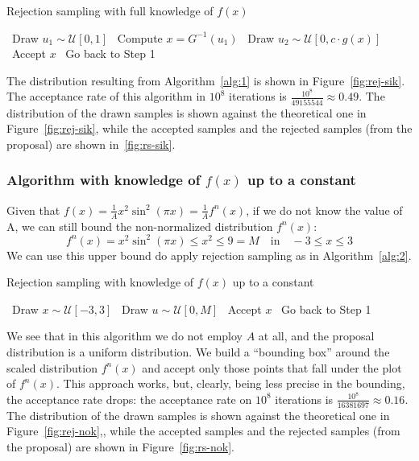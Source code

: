 \documentclass[a4paper,12pt]{article}
\begin{document}
\begin{algorithm}
  \caption{Rejection sampling with full knowledge of $f(x)$}\label{alg:1}
  \begin{algorithmic}[1]
    \STATE~Draw $u_1 \sim \mathcal{U}[0,1]$
    \STATE~Compute $x = G^{-1}(u_1)$
    \STATE~Draw $u_2 \sim \mathcal{U}[0, c \cdot g(x)]$
    \STATE~Accept $x$
    \ELSE%
    \STATE~Go back to Step 1
    \ENDIF%
  \end{algorithmic}
\end{algorithm}

The distribution resulting from Algorithm~\ref{alg:1} is shown in Figure~\ref{fig:rej-sik}. The acceptance rate of this algorithm in $10^8$ iterations is $\frac{10^8}{49155544} \approx 0.49$. The distribution of the drawn samples is shown against the theoretical one in Figure~\ref{fig:rej-sik}, while the accepted samples and the rejected samples (from the proposal) are shown in~\ref{fig:rs-sik}.

\subsubsection*{Algorithm with knowledge of $f(x)$ up to a constant}
Given that $f(x) = \frac{1}{A}x^2\sin^2(\pi x)=\frac{1}{A}f^n(x)$, if we do not know the value of A, we can still bound the non-normalized distribution $f^{n}(x)$:
\begin{equation}
  f^n(x) = x^2\sin^2(\pi x) \leq x^2 \leq 9 = M\quad \text{in}\quad -3\leq x\leq3
\end{equation}
We can use this upper bound do apply rejection sampling as in Algorithm~\ref{alg:2}.

\begin{algorithm}
  \caption{Rejection sampling with knowledge of $f(x)$ up to a constant}\label{alg:2}
  \begin{algorithmic}[1]
    \STATE~Draw $x \sim \mathcal{U}[-3,3]$
    \STATE~Draw $u \sim \mathcal{U}[0, M]$
    \STATE~Accept $x$
    \ELSE%
    \STATE~Go back to Step 1
    \ENDIF%
  \end{algorithmic}
\end{algorithm}

We see that in this algorithm we do not employ $A$ at all, and the proposal distribution is a uniform distribution. We build a ``bounding box'' around the scaled distribution $f^n(x)$ and accept only those points that fall under the plot of $f^n(x)$. This approach works, but, clearly, being less precise in the bounding, the acceptance rate drops: the acceptance rate on $10^8$ iterations is $\frac{10^8}{16381697} \approx 0.16$. The distribution of the drawn samples is shown against the theoretical one in Figure~\ref{fig:rej-nok},, while the accepted samples and the rejected samples (from the proposal) are shown in Figure~\ref{fig:rs-nok}.
\end{document}

